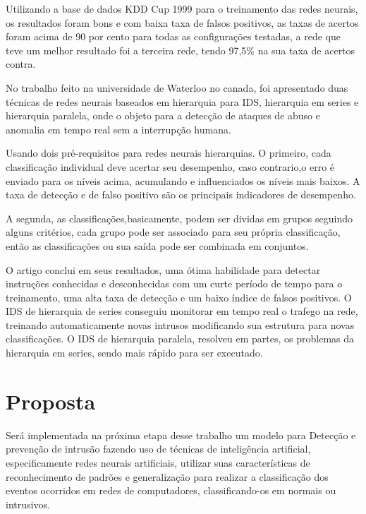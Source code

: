 \documentclass[
	12pt,				%
	openright,			%
	oneside,
	a4paper,			%
	english,			%
	french,				%
	spanish,			%
	brazil				%
	]{abntex2}
\begin{document}
Utilizando a base de dados KDD Cup 1999 para o treinamento das redes neurais, os resultados foram bons e com baixa taxa de falsos positivos, as taxas de acertos foram acima de 90 por cento para todas as configurações testadas, a rede que teve um melhor resultado foi a terceira rede, tendo 97,5\% na sua taxa de acertos contra.

No trabalho feito na universidade de Waterloo no canada\cite{Chunlin}, foi apresentado duas técnicas de redes neurais baseados em hierarquia para IDS, hierarquia em series e hierarquia paralela, onde o objeto para a detecção de ataques de abuso e anomalia em tempo real sem a interrupção humana.

Usando dois pré-requisitos para redes neurais hierarquias. O primeiro, cada classificação individual deve acertar seu desempenho, caso contrario,o erro é enviado para os níveis acima, acumulando e influenciados os níveis mais baixos. A taxa de detecção e de falso positivo são os principais indicadores de desempenho. 

A segunda, as classificações,basicamente, podem ser dividas em grupos seguindo alguns critérios, cada grupo pode ser associado para seu própria classificação, então as classificações ou sua saída pode ser combinada em conjuntos.

O artigo conclui em seus resultados, uma ótima habilidade para detectar instruções conhecidas e desconhecidas com um curte período de tempo para o treinamento, uma alta taxa de detecção e um baixo índice de falsos positivos.
O IDS de hierarquia de series conseguiu monitorar em tempo real o trafego na rede, treinando automaticamente novas intrusos modificando sua estrutura para novas classificações. O IDS de hierarquia paralela, resolveu em partes, os problemas da hierarquia em series, sendo mais rápido para ser executado.


\chapter[Proposta]{Proposta}

Será implementada na próxima etapa desse trabalho um modelo para Detecção e prevenção de intrusão fazendo uso de técnicas de inteligência artificial, especificamente redes neurais artificiais, utilizar suas características de reconhecimento de padrões e generalização para realizar a classificação dos eventos ocorridos em redes de computadores, classificando-os em normais ou intrusivos.
\end{document}
